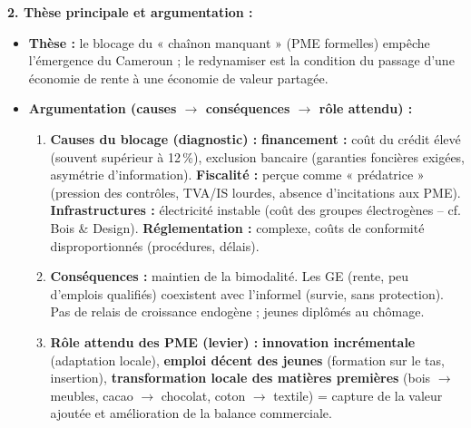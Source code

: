 \documentclass[11pt]{article}
\begin{document}
\begin{corrige}
\textbf{2. Thèse principale et argumentation :}
\begin{itemize}
    \item \textbf{Thèse :} \og le blocage du « chaînon manquant » (PME formelles) empêche l'émergence du Cameroun ; le redynamiser est la condition du passage d'une économie de rente à une économie de valeur partagée. \fg
    \item \textbf{Argumentation (causes $\rightarrow$ conséquences $\rightarrow$ rôle attendu) :}
    \begin{enumerate}
        \item \textbf{Causes du blocage (diagnostic) :} \textbf{financement :} coût du crédit élevé (souvent supérieur à 12\,\%), exclusion bancaire (garanties foncières exigées, asymétrie d'information). \textbf{Fiscalité :} perçue comme « prédatrice » (pression des contrôles, TVA/IS lourdes, absence d'incitations aux PME). \textbf{Infrastructures :} électricité instable (coût des groupes électrogènes -- cf. Bois \& Design). \textbf{Réglementation :} complexe, coûts de conformité disproportionnés (procédures, délais).
        \item \textbf{Conséquences :} maintien de la bimodalité. Les GE (rente, peu d'emplois qualifiés) coexistent avec l'informel (survie, sans protection). Pas de relais de croissance endogène ; jeunes diplômés au chômage.
        \item \textbf{Rôle attendu des PME (levier) :} \textbf{innovation incrémentale} (adaptation locale), \textbf{emploi décent des jeunes} (formation sur le tas, insertion), \textbf{transformation locale des matières premières} (bois $\rightarrow$ meubles, cacao $\rightarrow$ chocolat, coton $\rightarrow$ textile) = capture de la valeur ajoutée et amélioration de la balance commerciale.
    \end{enumerate}
\end{itemize}


\end{corrige}
\end{document}
